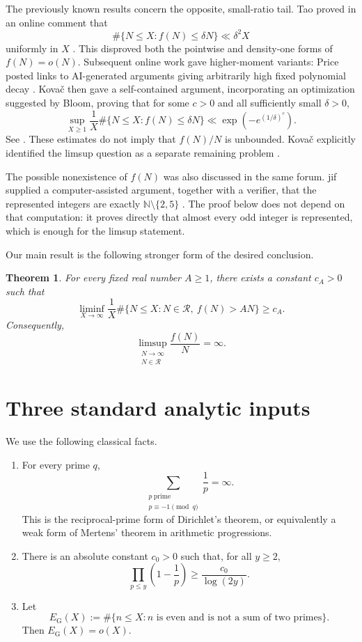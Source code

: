 \documentclass[11pt]{article}
\newtheorem{theorem}{Theorem}[section]
\theoremstyle{definition}
\theoremstyle{remark}
\newcommand{\N}{\mathbb N}
\newcommand{\Rset}{\mathscr R}
\begin{document}
The previously known results concern the opposite, small-ratio tail.  Tao proved in an online comment that
\[
\#\{N\leq X:f(N)\leq \delta N\}\ll \delta^2X
\]
uniformly in $X$ \cite{TaoComment}.  This disproved both the pointwise and density-one forms of $f(N)=o(N)$.  Subsequent online work gave higher-moment variants: Price posted links to AI-generated arguments giving arbitrarily high fixed polynomial decay \cite{PriceComment}.  Kova\v{c} then gave a self-contained argument, incorporating an optimization suggested by Bloom, proving that for some $c>0$ and all sufficiently small $\delta>0$,
\[
\sup_{X\geq1}\frac{1}{X}\#\{N\leq X:f(N)\leq\delta N\}
\ll \exp\!\left(-e^{(1/\delta)^c}\right).
\]
See \cite{Kovac,BloomComment}.
These estimates do not imply that $f(N)/N$ is unbounded.  Kova\v{c} explicitly identified the limsup question as a separate remaining problem \cite{KovacForum}.

The possible nonexistence of $f(N)$ was also discussed in the same forum.  jif supplied a computer-assisted argument, together with a verifier, that the represented integers are exactly $\N\setminus\{2,5\}$ \cite{jif,jifRepo}.  The proof below does not depend on that computation: it proves directly that almost every odd integer is represented, which is enough for the limsup statement.

Our main result is the following stronger form of the desired conclusion.

\begin{theorem}\label{thm:main}
For every fixed real number $A\geq1$, there exists a constant $c_A>0$ such that
\[
\liminf_{X\to\infty}\frac1X
\#\bigl\{N\leq X:N\in\Rset,\ f(N)>AN\bigr\}
\geq c_A.
\]
Consequently,
\[
\limsup_{\substack{N\to\infty\\N\in\Rset}}
\frac{f(N)}{N}=\infty.
\]
\end{theorem}

\section{Three standard analytic inputs}

We use the following classical facts.

\begin{enumerate}[label=\textup{(A\arabic*)},leftmargin=2.7em]
\item\label{A:AP}
For every prime $q$,
\[
\sum_{\substack{p\ \mathrm{prime}\\p\equiv-1\pmod q}}\frac1p=\infty.
\]
This is the reciprocal-prime form of Dirichlet's theorem, or equivalently a weak form of Mertens' theorem in arithmetic progressions.

\item\label{A:Mertens}
There is an absolute constant $c_0>0$ such that, for all $y\geq2$,
\[
\prod_{p\leq y}\left(1-\frac1p\right)\geq \frac{c_0}{\log(2y)}.
\]

\item\label{A:Goldbach}
Let
\[
E_{\mathrm G}(X):=
\#\{n\leq X:n\text{ is even and is not a sum of two primes}\}.
\]
Then $E_{\mathrm G}(X)=o(X)$.
\end{enumerate}
\end{document}
